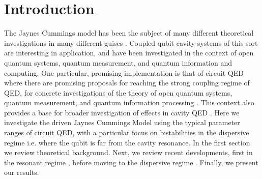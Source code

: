 \section{Introduction}
The Jaynes Cummings model has been the subject of many different theoretical investigations in many different guises
\cite{Abdalla2011}
\cite{Benivegna1994}. 
Coupled qubit cavity systems of this sort are interesting in application, and have been investigated in the context of open quantum systems, quantum measurement, and quantum information and computing. One particular, promising implementation is that of circuit QED 
\cite{Blais2004a}
where there are promising proposals for reaching the strong coupling regime of QED, for concrete investigations of the theory of open quantum systems, quantum measurement, and quantum information processing
\cite{You2003}
\cite{Hood2000}
\cite{Irish2003}
. This context also provides a base for broader investigation of effects in cavity QED 
\cite{Al-Saidi2002}
\cite{Plastina2003}
\cite{Marquardt2001}
. Here we investigate the driven Jaynes Cummings Model using the typical parameter ranges of circuit QED, with a particular focus on bistabilities in the dispersive regime i.e. where the qubit is far from the cavity resonance. In the first section we review theoretical background. Next, we review recent developments, first in the resonant regime
\cite{Carmichael2015}, 
before moving to the dispersive regime 
\cite{Bishop2010}. 
Finally, we present our results.

